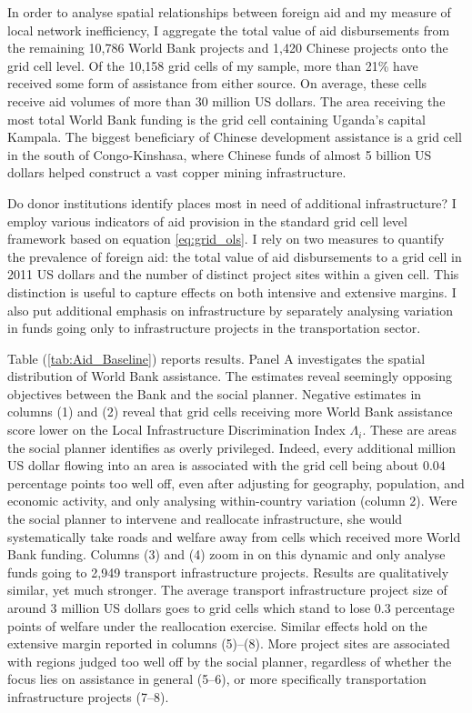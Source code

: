 \documentclass[11pt, oneside]{article}   	%
\let\oldref\ref
\renewcommand{\ref}[1]{(\oldref{#1})}
\begin{document}
In order to analyse spatial relationships between foreign aid and my measure of local network inefficiency, I aggregate the total value of aid disbursements from the remaining 10,786 World Bank projects and 1,420 Chinese projects onto the grid cell level. Of the 10,158 grid cells of my sample, more than 21\% have received some form of assistance from either source. On average, these cells receive aid volumes of more than 30 million US dollars. The area receiving the most total World Bank funding is the grid cell containing Uganda's capital Kampala. The biggest beneficiary of Chinese development assistance is a grid cell in the south of Congo-Kinshasa, where Chinese funds of almost 5 billion US dollars helped construct a vast copper mining infrastructure.

Do donor institutions identify places most in need of additional infrastructure? I employ various indicators of aid provision in the standard grid cell level framework based on equation \eqref{eq:grid_ols}. I rely on two measures to quantify the prevalence of foreign aid: the total value of aid disbursements to a grid cell in 2011 US dollars and the number of distinct project sites within a given cell. This distinction is useful to capture effects on both intensive and extensive margins. I also put additional emphasis on infrastructure by separately analysing variation in funds going only to infrastructure projects in the transportation sector.

Table \ref{tab:Aid_Baseline} reports results. Panel A investigates the spatial distribution of World Bank assistance. The estimates reveal seemingly opposing objectives between the Bank and the social planner. Negative estimates in columns (1) and (2) reveal that grid cells receiving more World Bank assistance score lower on the Local Infrastructure Discrimination Index $\Lambda_{i}$. These are areas the social planner identifies as overly privileged. Indeed, every additional million US dollar flowing into an area is associated with the grid cell being about $0.04$ percentage points too well off, even after adjusting for geography, population, and economic activity, and only analysing within-country variation (column 2). Were the social planner to intervene and reallocate infrastructure, she would systematically take roads and welfare away from cells which received more World Bank funding. Columns (3) and (4) zoom in on this dynamic and only analyse funds going to 2,949 transport infrastructure projects. Results are qualitatively similar, yet much stronger. The average transport infrastructure project size of around 3 million US dollars goes to grid cells which stand to lose $0.3$ percentage points of welfare under the reallocation exercise. Similar effects hold on the extensive margin reported in columns (5)--(8). More project sites are associated with regions judged too well off by the social planner, regardless of whether the focus lies on assistance in general (5--6), or more specifically transportation infrastructure projects (7--8).
\end{document}

